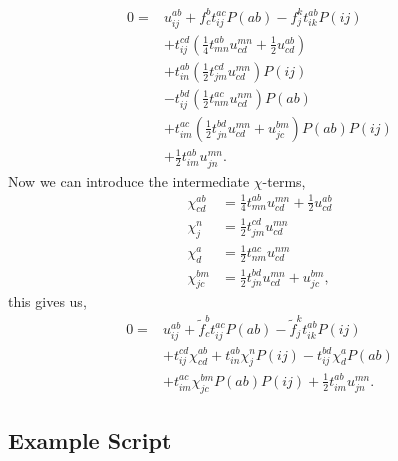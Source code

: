 \documentclass[
    a4paper, aps, twocolumn, floatfix, superscriptaddress,
    nofootinbib]{revtex4-1}
\newcommand{\1}{\mathds{1}}
\begin{document}
    \begin{equation}
        \begin{aligned}
        0 =& u^{ab}_{ij} + f^b_c t^{ac}_{ij}P(ab) - f^k_jt^{ab}_{ik}P(ij) \\
          &+ t^{cd}_{ij} \left(\frac{1}{4}t^{ab}_{mn} u^{mn}_{cd} + \frac{1}{2} u^{ab}_{cd} \right) \\
          &+  t^{ab}_{in} \left(\frac{1}{2} t^{cd}_{jm} u^{mn}_{cd}\right) P(ij) \\
          &- t^{bd}_{ij} \left(\frac{1}{2}t^{ac}_{nm}  u^{nm}_{cd}\right) P(ab) \\
          &+ t^{ac}_{im}\left(\frac{1}{2} t^{bd}_{jn} u^{mn}_{cd} + u^{bm}_{jc} \right)P(ab) P(ij) \\
          &+ \frac{1}{2}t^{ab}_{im} u^{mn}_{jn}.
        \end{aligned}
    \end{equation}
    Now we can introduce the intermediate $\chi$-terms,
    \begin{align}
        \chi^{ab}_{cd} &= \frac{1}{4}t^{ab}_{mn} u^{mn}_{cd} + \frac{1}{2}u^{ab}_{cd} \\
        \chi^n_j &= \frac{1}{2}t^{cd}_{jm} u^{mn}_{cd} \\
        \chi^a_d &= \frac{1}{2} t^{ac}_{nm} u^{nm}_{cd} \\
        \chi^{bm}_{jc} &= \frac{1}{2}t^{bd}_{jn}u^{mn}_{cd} + u^{bm}_{jc},
    \end{align}
    this gives us,
    \begin{equation}
        \begin{aligned}
            0 =& u^{ab}_{ij} + \tilde{f}^b_c t^{ac}_{ij}P(ab) - \tilde{f}^k_jt^{ab}_{ik}P(ij) \\
              &+ t^{cd}_{ij}\chi^{ab}_{cd} + t^{ab}_{in}\chi^n_jP(ij)
               - t^{bd}_{ij}\chi^a_dP(ab) \\
              &+ t^{ac}_{im}\chi^{bm}_{jc}P(ab)P(ij) + \frac{1}{2}t^{ab}_{im}u^{mn}_{jn}.
        \end{aligned}
    \end{equation}


\vfill
\clearpage
\newpage
\begin{widetext}
\section{Example Script}

    \label{app:sample_script}

    \vspace{10pt}

    \inputminted[firstline=0, lastline=113]{python}{../scripts/comparison.py}

\end{widetext}


\end{document}
